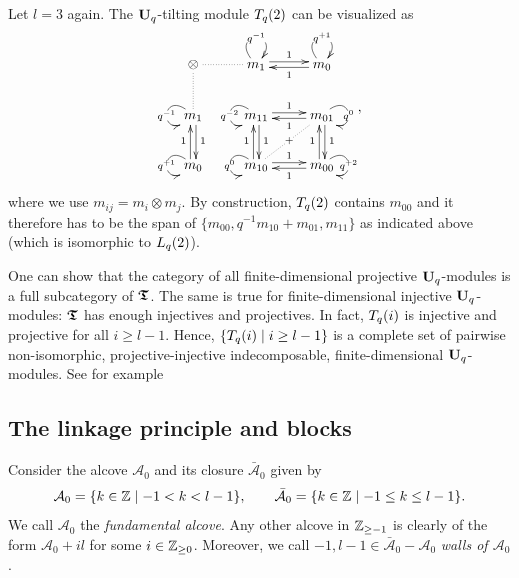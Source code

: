 \begin{ex}\label{ex-tilt1}
Let $l=3$ again. The $\boldsymbol{\mathrm{U}}_q$-tilting module $T_q({2})$ can be 
visualized as
\begin{equation*}
\begin{gathered}
\xymatrix{
 \otimes \ar@{.}[r]\ar@{.}[d]& m_1 \ar@<2pt>[r]^{1}\ar@(ul,ur)|{q^{-1}}  &  m_0  \ar@<2pt>[l]^1\ar@(ul,ur)|{q^{+1}}  \\
 m_1\ar@<2pt>[d]^{1}\ar@(ul,dl)|{q^{-1}} & m_{11} \ar@<2pt>[r]^{1}\ar@<2pt>[d]^{1}\ar@(ul,dl)|{q^{-2}}  &  m_{01}  \ar@<2pt>[l]^1\ar@<2pt>[d]^{1}\ar@{.}[dl]|{+}\ar@(ur,dr)|{q^{0}}  \\
 m_0\ar@<2pt>[u]^{1}\ar@(ul,dl)|{q^{+1}} & m_{10} \ar@<2pt>[r]^{1}\ar@<2pt>[u]^{1}\ar@(ul,dl)|{q^{0}}  &  m_{00}  \ar@<2pt>[l]^1\ar@<2pt>[u]^{1}\ar@(ur,dr)|{q^{+2}}  \\
}
\end{gathered},
\end{equation*}
where we use $m_{ij}=m_i\otimes m_j$. 
By construction, $T_q({2})$ contains $m_{00}$ and it therefore has to be the span of $\{m_{00},q^{-1}m_{10}+m_{01},m_{11}\}$ as indicated above (which is isomorphic to $L_q({2})$).
\end{ex}


\begin{rem}\label{rem-proj}
One can 
show that the category of all 
finite-dimensional projective $\boldsymbol{\mathrm{U}}_q$-modules
is a full 
subcategory of $\boldsymbol{\mathfrak{T}}$. 
The same is true for finite-dimensional 
injective $\boldsymbol{\mathrm{U}}_q$-modules: $\boldsymbol{\mathfrak{T}}$ has enough injectives and projectives. 
In fact, $T_q({i})$ is injective and projective 
for all $i\geq l-1$. Hence, 
$\{T_q({i})\mid i\geq l-1\}$ is a complete set of 
pairwise non-isomorphic, projective-injective
indecomposable, finite-dimensional $\boldsymbol{\mathrm{U}}_q$-modules. 
See for example~\cite[Section~5]{an1}
\end{rem}




\subsection{The linkage principle and blocks}\label{sub-blocks}
Consider the alcove $\mathcal A_0$ 
and its closure $\bar{\mathcal A}_0$ given by
\[
\mathcal A_0=\{k\in\mathbb{Z}\mid -1<k<l-1\},\quad\quad\bar{\mathcal A}_0=\{k\in\mathbb{Z}\mid -1\leq k \leq l-1\}.
\]
We call $\mathcal A_0$ the \textit{fundamental alcove}. 
Any other alcove in $\mathbb{Z}_{\geq -1}$ is 
clearly of the form $\mathcal A_0+il$ for 
some $i\in\mathbb{Z}_{\geq 0}$. Moreover, we call 
$-1,l-1\in\bar{\mathcal A}_0-\mathcal A_0$ \textit{walls of $\mathcal A_0$}.





